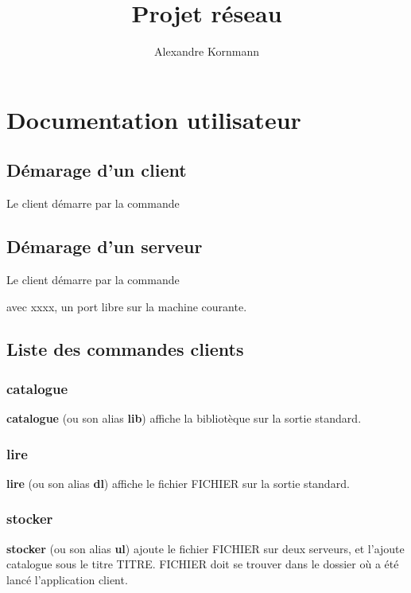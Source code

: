 \documentclass[10pt,a4paper]{article}
\title{Projet réseau}
\author{Alexandre Kornmann}
\begin{document}
\maketitle

\newpage

\tableofcontents

\newpage

\section{Documentation utilisateur}
\subsection{Démarage d'un client}

Le client démarre par la commande
\begin{center}
\end{center}

\subsection{Démarage d'un serveur}

Le client démarre par la commande
\begin{center}
\end{center}avec xxxx, un port libre sur la machine courante. 
\subsection{Liste des commandes clients}

\subsubsection{catalogue}
\begin{center}
\end{center}
\textbf{catalogue} (ou son alias \textbf{lib}) affiche la bibliotèque sur la sortie standard.

\subsubsection{lire}
\begin{center}
\end{center}
\textbf{lire} (ou son alias \textbf{dl}) affiche le fichier FICHIER sur la sortie standard.

\subsubsection{stocker}
\begin{center}
\end{center}
\textbf{stocker} (ou son alias \textbf{ul}) ajoute le fichier FICHIER sur deux serveurs, et l'ajoute catalogue sous le titre TITRE. FICHIER doit se trouver dans le dossier où a été lancé l'application client.
\end{document}
